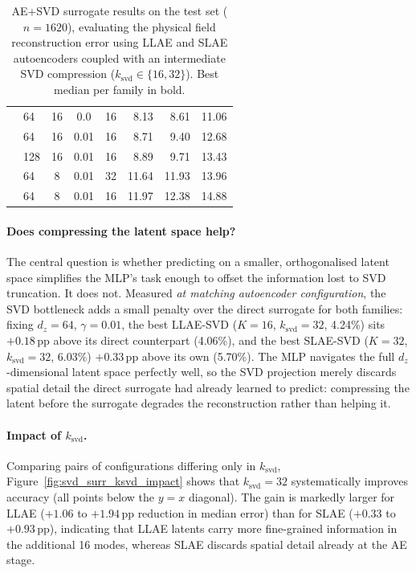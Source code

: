 ﻿\documentclass[a4paper,12pt]{article}
\theoremstyle{definition}
\theoremstyle{remark}
\begin{document}
\begin{table}[htbp]
\begin{tabular}{llcccrrr}
          & 64  & 16 & 0.0   & 16 & 8.13 & 8.61 & 11.06 \\
          & 64  & 16 & 0.01  & 16 & 8.71 & 9.40 & 12.68 \\
          & 128 & 16 & 0.01  & 16 & 8.89 & 9.71 & 13.43 \\
          & 64  &  8 & 0.01  & 32 & 11.64 & 11.93 & 13.96 \\
          & 64  &  8 & 0.01  & 16 & 11.97 & 12.38 & 14.88 \\
        \bottomrule
    \end{tabular}
    \caption{AE+SVD surrogate results on the test set ($n=1620$), evaluating the physical field reconstruction error using LLAE and SLAE autoencoders coupled with an intermediate SVD compression ($k_{\mathrm{svd}} \in \{16, 32\}$). Best median per family in bold.}
    \label{tab:ae_svd_surr_results}
\end{table}

\paragraph{Does compressing the latent space help?}
The central question is whether predicting on a smaller, orthogonalised latent space simplifies the MLP's task enough to offset the information lost to SVD truncation. It does not. Measured \emph{at matching autoencoder configuration}, the SVD bottleneck adds a small penalty over the direct surrogate for both families: fixing $d_z=64$, $\gamma=0.01$, the best LLAE-SVD ($K=16$, $k_{\mathrm{svd}}=32$, 4.24\%) sits $+0.18$\,pp above its direct counterpart (4.06\%), and the best SLAE-SVD ($K=32$, $k_{\mathrm{svd}}=32$, 6.03\%) $+0.33$\,pp above its own (5.70\%). The MLP navigates the full $d_z$-dimensional latent space perfectly well, so the SVD projection merely discards spatial detail the direct surrogate had already learned to predict: compressing the latent before the surrogate degrades the reconstruction rather than helping it.


\paragraph{Impact of $k_{\mathrm{svd}}$.}
Comparing pairs of configurations differing only in $k_{\mathrm{svd}}$, Figure~\ref{fig:svd_surr_ksvd_impact} shows that $k_{\mathrm{svd}}=32$ systematically improves accuracy (all points below the $y=x$ diagonal). The gain is markedly larger for LLAE ($+1.06$ to $+1.94$\,pp reduction in median error) than for SLAE ($+0.33$ to $+0.93$\,pp), indicating that LLAE latents carry more fine-grained information in the additional 16 modes, whereas SLAE discards spatial detail already at the AE stage.
\end{document}
